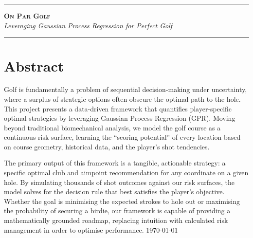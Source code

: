 \documentclass[11pt, letterpaper]{article}
\begin{document}
\newcommand{\origin}{(x_1^0,x_2^0)}
\newcommand{\landing}{(x_1^l,x_2^l)}
\newcommand{\coord}{(x_1, x_2)}
\newcommand{\shotdec}{\mathbf{x}}
\newcommand{\aimpoint}{\theta}
\newcommand{\out}{\mathbf{x}}
\newcommand{\Out}{\mathbf{X}}
\newcommand{\Samp}{\mathbf{Z}}
\newcommand{\samp}{\mathbf{z}}
\newcommand{\gridexplicit}[j]{(g^j_1, g^j_2)}
\newcommand{\grid}{\mathbf{g}}




\begin{titlepage}
    \centering
    \vspace*{2.5cm}
    
    \rule{\textwidth}{1.5pt}\vspace{0.5cm}
    
    {\huge \bfseries \scshape On Par Golf} \\
    \vspace{0.3cm}
    {\Large \itshape Leveraging Gaussian Process Regression for Perfect Golf} %
    
    \vspace{0.5cm}
    \rule{\textwidth}{1.5pt}
    
    \vspace{3cm}
    
    \section*{Abstract}
    \centering
    \noindent
       Golf is fundamentally a problem of sequential decision-making under uncertainty, where a surplus of strategic options often obscure the optimal path to the hole. This project presents a data-driven framework that quantifies player-specific optimal strategies by leveraging Gaussian Process Regression (GPR). Moving beyond traditional biomechanical analysis, we model the golf course as a continuous risk surface, learning the ``scoring potential'' of every location based on course geometry, historical data, and the player's shot tendencies.

       The primary output of this framework is a tangible, actionable strategy: a specific optimal club and aimpoint recommendation for any coordinate on a given hole. By simulating thousands of shot outcomes against our risk surfaces, the model solves for the decision rule that best satisfies the player's objective. Whether the goal is minimising the expected strokes to hole out or maximising the probability of securing a birdie, our framework is capable of providing a mathematically grounded roadmap, replacing intuition with calculated risk management in order to optimise performance.
    \vfill
    \today
\end{titlepage}
\end{document}
